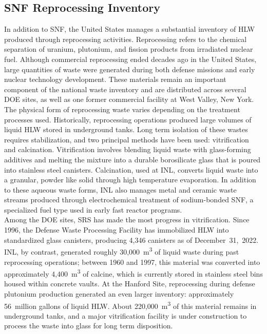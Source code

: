 \subsection{\gls{SNF} Reprocessing Inventory}


    In addition to \gls{SNF}, the United States manages a substantial inventory of \gls{HLW}
    produced through reprocessing activities. Reprocessing refers to the chemical separation of uranium, plutonium, and fission
    products from irradiated nuclear fuel. Although commercial reprocessing ended decades ago in the United States,
    large quantities of waste were generated during both defense missions and early nuclear technology development.
    These materials remain an important component of the national waste inventory and are distributed across several \gls{DOE} sites,
    as well as one former commercial facility at West Valley, New York.\\

    The physical form of reprocessing waste varies depending on the treatment processes used.
    Historically, reprocessing operations produced large volumes of liquid \gls{HLW} stored in underground tanks.
    Long term isolation of these wastes requires stabilization, and two principal methods have been used: vitrification and calcination.
    Vitrification involves blending liquid waste with glass-forming additives and melting the mixture into a durable borosilicate glass
    that is poured into stainless steel canisters. Calcination, used at \gls{INL}, converts liquid waste into
    a granular, powder like solid through high temperature evaporation. In addition to these aqueous waste forms, \gls{INL} also manages metal
    and ceramic waste streams produced through electrochemical treatment of sodium-bonded \gls{SNF}, a specialized fuel type used in early
    fast reactor programs\cite{aliberti_nuclear_2006}.\\

    Among the \gls{DOE} sites, \gls{SRS} has made the most progress in vitrification. Since 1996, the Defense Waste
    Processing Facility has immobilized \gls{HLW} into standardized glass canisters, producing 4,346 canisters as of December~31,~2022.
    \gls{INL}, by contrast, generated roughly 30,000~m\textsuperscript{3} of liquid waste during past reprocessing operations; between
    1960 and 1997, this material was converted into approximately 4,400~m\textsuperscript{3} of calcine, which is currently stored
    in stainless steel bins housed within concrete vaults. At the Hanford Site, reprocessing during defense plutonium production
    generated an even larger inventory: approximately 56~million gallons of liquid \gls{HLW}. About 220,000~m\textsuperscript{3} of this
    material remains in underground tanks, and a major vitrification facility is under construction to process the waste into glass
    for long term disposition.\\

